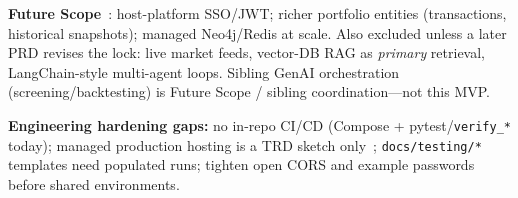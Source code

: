 \textbf{Future Scope}~\cite{prd}: host-platform SSO/JWT; richer portfolio entities (transactions, historical snapshots); managed Neo4j/Redis at scale. Also excluded unless a later PRD revises the lock: live market feeds, vector-DB RAG as \emph{primary} retrieval, LangChain-style multi-agent loops. Sibling GenAI orchestration (screening/backtesting) is Future Scope / sibling coordination---not this MVP.

\textbf{Engineering hardening gaps:} no in-repo CI/CD (Compose + pytest/\texttt{verify\_*} today); managed production hosting is a TRD sketch only~\cite{trd}; \texttt{docs/testing/*} templates need populated runs; tighten open CORS and example passwords before shared environments.
